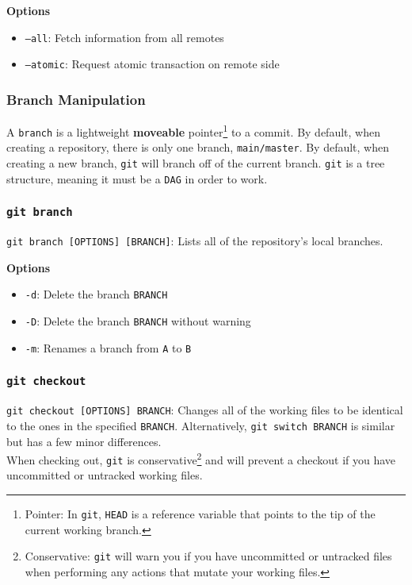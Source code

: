 \documentclass[13pt]{article}
\begin{document}
\textbf{Options}
\begin{itemize}[label=]
\item \texttt{--all}: Fetch information from all remotes
\item \texttt{--atomic}: Request atomic transaction on remote side
\end{itemize}





\subsubsection{Branch Manipulation}
A \texttt{branch} is a lightweight \textbf{moveable} pointer\footnote{Pointer: In \texttt{git}, \texttt{HEAD} is a reference variable that points to the tip of the current working branch.} to a commit. By default, when creating a repository, there is only one branch, \texttt{main/master}. By default, when creating a new branch, \texttt{git} will branch off of the current branch. \texttt{git} is a tree structure, meaning it  must be a \texttt{DAG} in order to work.


\subsubsection*{\texttt{git branch}}
\texttt{git branch [OPTIONS] [BRANCH]}: Lists all of the repository's local branches.

\textbf{Options}
\begin{itemize}[label=]
\item \texttt{-d}: Delete the branch \texttt{BRANCH}
\item \texttt{-D}: Delete the branch \texttt{BRANCH} without warning
\item \texttt{-m}: Renames a branch from \texttt{A} to \texttt{B}
\end{itemize}

\subsubsection*{\texttt{git checkout}}
\texttt{git checkout [OPTIONS] BRANCH}: Changes all of the working files to be identical to the ones in the specified \texttt{BRANCH}. Alternatively, \texttt{git switch BRANCH} is similar but has a few minor differences. \\
When checking out, \texttt{git} is conservative\footnote{Conservative: \texttt{git} will warn you if you have uncommitted or untracked files when performing any actions that mutate your working files.} and will prevent a checkout if you have uncommitted or untracked working files.
\end{document}
